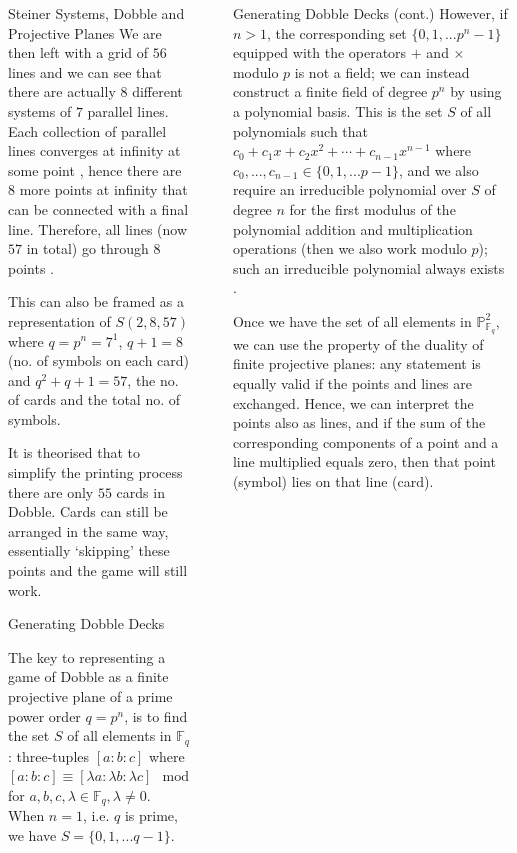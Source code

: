 \documentclass[final]{beamer}
\newlength{\sepwidth}
\newlength{\colwidth}
\newcommand{\separatorcolumn}{\begin{column}{\sepwidth}\end{column}}
\begin{document}
\begin{frame}[t]
\begin{columns}[t]
\begin{column}{\colwidth}
\begin{block}{Steiner Systems, Dobble and Projective Planes}
    We are then left with a grid of $56$ lines and we can see that there are actually $8$ different systems of $7$ parallel lines. Each collection of parallel lines converges at infinity at some point \cite{spencer1999}, hence there are $8$ more points at infinity that can be connected with a final line. Therefore, all lines (now $57$ in total) go through $8$ points \cite{Parker2021}.

    This can also be framed as a representation of $S(2,8,57)$ where $q = p^n = 7^1$, $q + 1 = 8$ (no. of symbols on each card) and $q^2 + q + 1 = 57$, the no. of cards and the total no. of symbols. 

    It is theorised that to simplify the printing process there are only $55$ cards in Dobble. Cards can still be arranged in the same way, essentially `skipping' these points and the game will still work. 

\end{block}

\begin{exampleblock}{Generating Dobble Decks}

    The key to representing a game of Dobble as a finite projective plane of a prime power order $q = p^n$, is to find the set $S$ of all elements in $\mathbb{F}_q$: three-tuples $[a:b:c]$ where $[a:b:c] \equiv [\lambda a:\lambda b:\lambda c] \mod p$ for $a,b,c,\lambda \in \mathbb{F}_q, \lambda \ne 0$. When $n = 1$, i.e. $q$ is prime, we have $S = \{0, 1, ... q-1\}$. 
\end{exampleblock}
\end{column}

\separatorcolumn

\begin{column}{\colwidth}
\begin{exampleblock}{Generating Dobble Decks (cont.)}
    However, if $n > 1$, the corresponding set $\{ 0, 1, ... p^n-1 \}$ equipped with the operators $+$ and $\times$ modulo $p$ is not a field; we can instead construct a finite field of degree $p^n$ by using a polynomial basis. This is the set $S$ of all polynomials such that $c_0 + c_1x + c_2x^2 + \cdots + c_{n-1}x^{n-1}$ where $c_0, ..., c_{n-1} \in \{0, 1, ... p-1\}$, and we also require an irreducible polynomial over $S$ of degree $n$ for the first modulus of the polynomial addition and multiplication operations (then we also work modulo $p$); such an irreducible polynomial always exists \cite{magidin2012}.
    
    Once we have the set of all elements in $\mathbb{P}^2_{\mathbb{F}_q}$, we can use the property of the duality of finite projective planes: any statement is equally valid if the points and lines are exchanged. Hence, we can interpret the points also as lines, and if the sum of the corresponding components of a point and a line multiplied equals zero, then that point (symbol) lies on that line (card).


\end{exampleblock}
\end{column}
\end{columns}
\end{frame}
\end{document}
